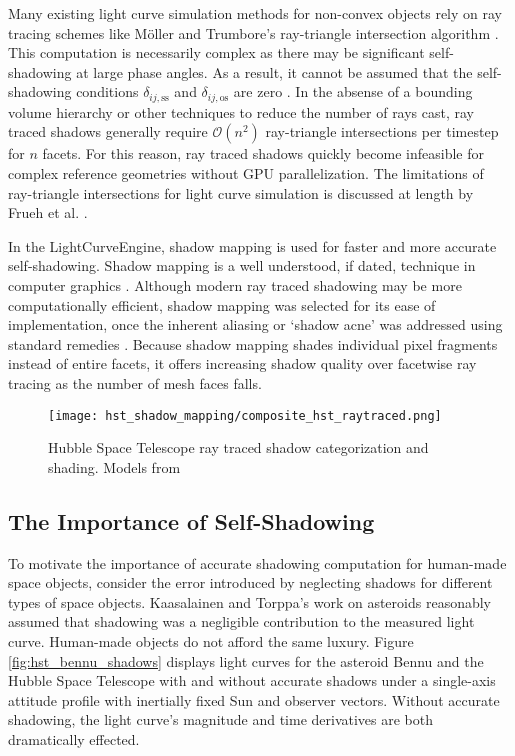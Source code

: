 Many existing light curve simulation methods for non-convex objects rely on ray tracing schemes like Möller and Trumbore's ray-triangle intersection algorithm \cite{moller2005,fan2020thesis}. This computation is necessarily complex as there may be significant self-shadowing at large phase angles. As a result, it cannot be assumed that the self-shadowing conditions $\delta_{ij,\text{ss}}$ and $\delta_{ij,\text{os}}$ are zero \cite{frueh2014,fan2020thesis}. In the absense of a bounding volume hierarchy or other techniques to reduce the number of rays cast, ray traced shadows generally require $\mathcal{O}(n^2)$ ray-triangle intersections per timestep for $n$ facets. For this reason, ray traced shadows quickly become infeasible for complex reference geometries without GPU parallelization. The limitations of ray-triangle intersections for light curve simulation is discussed at length by Frueh et al. \cite{frueh2014}.

In the LightCurveEngine, shadow mapping is used for faster and more accurate self-shadowing. Shadow mapping is a well understood, if dated, technique in computer graphics \cite{kolivand2013}. Although modern ray traced shadowing may be more computationally efficient, shadow mapping was selected for its ease of implementation, once the inherent aliasing or `shadow acne' was addressed using standard remedies \cite{kolivand2013}. Because shadow mapping shades individual pixel fragments instead of entire facets, it offers increasing shadow quality over facetwise ray tracing as the number of mesh faces falls.

\graphicspath{{/Users/liamrobinson/Documents/msthesis/static_images/aas_2022_figs}}
\begin{figure}[!htb]
  \centering
  \texttt{[image: hst\_shadow\_mapping/composite\_hst\_raytraced.png]}
  \caption{Hubble Space Telescope ray traced shadow categorization and shading. Models from \cite{nasa_models}}
  \label{hst_shadows_ray}
\end{figure}

\subsection{The Importance of Self-Shadowing}

To motivate the importance of accurate shadowing computation for human-made space objects, consider the error introduced by neglecting shadows for different types of space objects. Kaasalainen and Torppa's work on asteroids reasonably assumed that shadowing was a negligible contribution to the measured light curve. Human-made objects do not afford the same luxury. Figure \ref{fig:hst_bennu_shadows} displays light curves for the asteroid Bennu and the Hubble Space Telescope with and without accurate shadows under a single-axis attitude profile with inertially fixed Sun and observer vectors. Without accurate shadowing, the light curve's magnitude and time derivatives are both dramatically effected.

